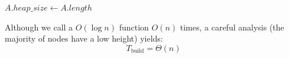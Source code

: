 \begin{algorithm}[H]
\caption{Build-Max-Heap($A$)}
\begin{algorithmic}[1]
\State $A.heap\_size \leftarrow A.length$
    \State {}
\EndFor
\end{algorithmic}
\end{algorithm}

\begin{tcolorbox}[colback=lightyellow, colframe=orange!70!black, fonttitle=\bfseries,
                  title={Complexity of Build-Max-Heap}]
Although we call a $O(\log n)$ function $O(n)$ times, a careful analysis
(the majority of nodes have a low height) yields:
\[ \boxed{T_{\text{build}} = \Theta(n)} \]
\end{tcolorbox}
